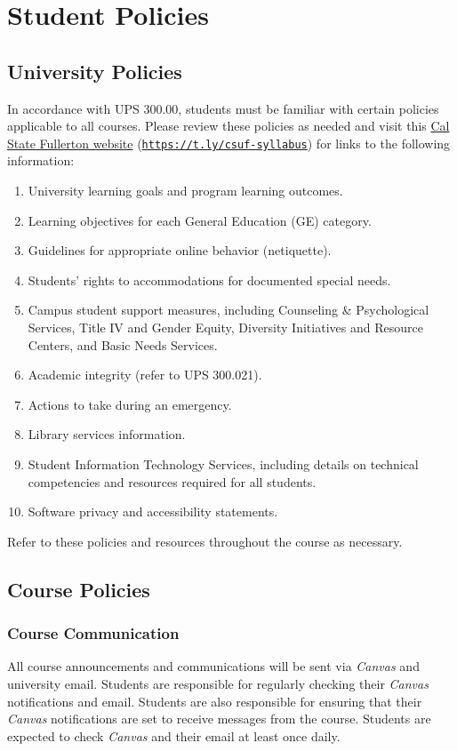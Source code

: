 \documentclass[12pt, letterpaper]{article}
\begin{document}
\section*{Student Policies}


\subsection*{University Policies}

	In accordance with UPS 300.00, students must be familiar with certain policies applicable to all courses. Please review these policies as needed and visit this \href{http://fdc.fullerton.edu/teaching/syllabus.php}{Cal State Fullerton website} (\href{https://t.ly/csuf-syllabus}{\texttt{https://t.ly/csuf-syllabus}}) for links to the following information:

\begin{enumerate}
	\item University learning goals and program learning outcomes.
	\item Learning objectives for each General Education (GE) category.
	\item Guidelines for appropriate online behavior (netiquette).
	\item Students' rights to accommodations for documented special needs.
	\item Campus student support measures, including Counseling \& Psychological Services, Title IV and Gender Equity, Diversity Initiatives and Resource Centers, and Basic Needs Services.
	\item Academic integrity (refer to UPS 300.021).
	\item Actions to take during an emergency.
	\item Library services information.
	\item Student Information Technology Services, including details on technical competencies and resources required for all students.
	\item Software privacy and accessibility statements.
\end{enumerate}

Refer to these policies and resources throughout the course as necessary.


\subsection*{Course Policies}

	\subsubsection*{Course Communication}
		All course announcements and communications will be sent via \emph{Canvas} and university email. Students are responsible for regularly checking their \emph{Canvas} notifications and email. Students are also responsible for ensuring that their \emph{Canvas} notifications are set to receive messages from the course. Students are expected to check \emph{Canvas} and their email at least once daily.
		
\end{document}
